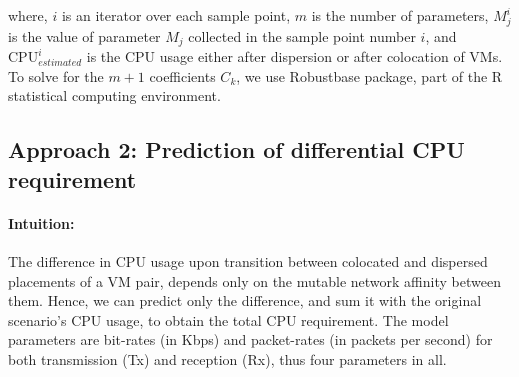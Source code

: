 \vspace{-0.2in}
\noindent where, $i$ is an iterator over each sample point,
$m$ is the number of parameters, $M^{i}_{j}$ is
the value of parameter $M_{j}$ collected in the sample point number 
$i$, and $\mbox{CPU}^{i}_{estimated}$ is the CPU usage
either after dispersion or after colocation of VMs.
To solve for the $m+1$ coefficients $C_{k}$, we use
Robustbase package, part of the R statistical computing environment.

\subsection*{Approach 2: Prediction of differential CPU requirement}

\paragraph{Intuition:} The difference in CPU usage upon transition between
colocated and dispersed placements of a VM pair, depends only on the mutable
network affinity between them. Hence, we can predict only
the difference, and sum it with the original scenario's CPU usage, to
obtain the total CPU requirement.
The model parameters are bit-rates (in Kbps) and 
packet-rates (in packets per second) for both 
transmission (Tx) and reception (Rx), thus four parameters
in all. %

